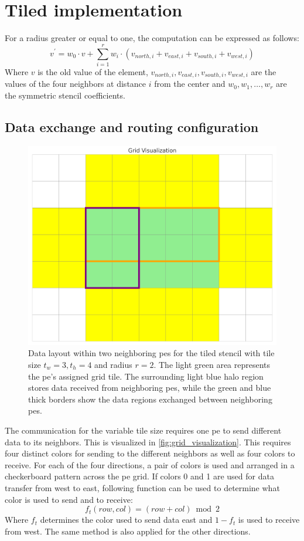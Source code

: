 \section{Tiled implementation}
For a radius greater or equal to one, the computation can be expressed as follows:
\begin{equation}
    \label{eq:stencil_computation_tiled}
    v^{'} = w_0 \cdot v + \sum_{i=1}^{r} w_i \cdot (v_{north,i} + v_{east,i} + v_{south,i} + v_{west,i})
\end{equation}
Where $v$ is the old value of the element, $v_{north,i}, v_{east,i}, v_{south,i}, v_{west,i}$ are the values of the four neighbors at distance $i$ from the center and $w_0, w_1, \dots, w_r$ are the symmetric stencil coefficients.

\subsection{Data exchange and routing configuration}
\begin{figure}
    \centering
    \includegraphics[width=0.5\linewidth]{grid_visualization.png}
    \caption{Data layout within two neighboring \acp{pe} for the tiled stencil with tile size $t_w=3, t_h=4$ and radius $r=2$. The light green area represents the \ac{pe}'s assigned grid tile. The surrounding light blue halo region stores data received from neighboring \acp{pe}, while the green and blue thick borders show the data regions exchanged between neighboring \acp{pe}.}
    \label{fig:grid_visualization}
\end{figure}
The communication for the variable tile size requires one \ac{pe} to send different data to its neighbors. This is visualized in \autoref{fig:grid_visualization}. This requires four distinct colors for sending to the different neighbors as well as four colors to receive. For each of the four directions, a pair of colors is used and arranged in a checkerboard pattern across the \ac{pe} grid.
If colors 0 and 1 are used for data transfer from west to east, following function can be used to determine what color is used to send and to receive:
\begin{equation}
    \label{eq:tiled_coloring_function}
    f_t(row, col)=(row+col) \bmod 2
\end{equation}
Where $f_t$ determines the color used to send data east and $1-f_t$ is used to receive from west. The same method is also applied for the other directions.

